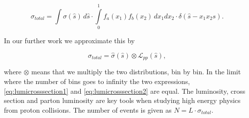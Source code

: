 \begin{equation} \label{eq:lumicrosssection1}
\sigma_{total}=\int \sigma(\hat s) \, d \hat s \cdot \int\limits_{0}^{1} f_{a}(x_{1}) f_{b}(x_{2})\, dx_{1}dx_{2} \cdot \delta(\hat s - x_{1}x_{2}s).
\end{equation}

In our further work we approximate this by

\begin{equation} \label{eq:lumicrosssection2}
\sigma_{total}= \hat \sigma(\hat s) \otimes  \mathcal{L}_{pp}(\hat s),
\end{equation}

where $\otimes$ means that we multiply the two distributions, bin by bin. In the limit where the number of bins goes to infinity the two expressions, \eqref{eq:lumicrosssection1} and \eqref{eq:lumicrosssection2} are equal. The luminosity, cross section and parton luminosity are key tools when studying high energy physics from proton collisions. The number of events is given as $N=L\cdot\sigma_{total}$.